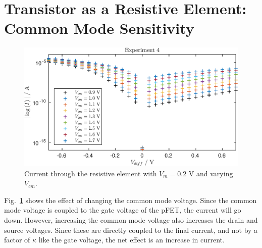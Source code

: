 \section{Transistor as a Resistive Element: Common Mode Sensitivity}
\begin{figure}
    \center
    \includegraphics{exp4.eps}
    \caption{Current through the resistive element with $V_m=0.2$ V and varying $V_{cm}$.}
    \label{fig:exp4}
\end{figure}
Fig.~\ref{fig:exp4} shows the effect of changing the common mode voltage. Since the common mode voltage is coupled to the gate voltage of the pFET, the current will go down. 
However, increasing the common mode voltage also increases the drain and source voltages. Since these are directly coupled to the final current, and not by a factor of
\(\kappa\) like the gate voltage, the net effect is an increase in current.
